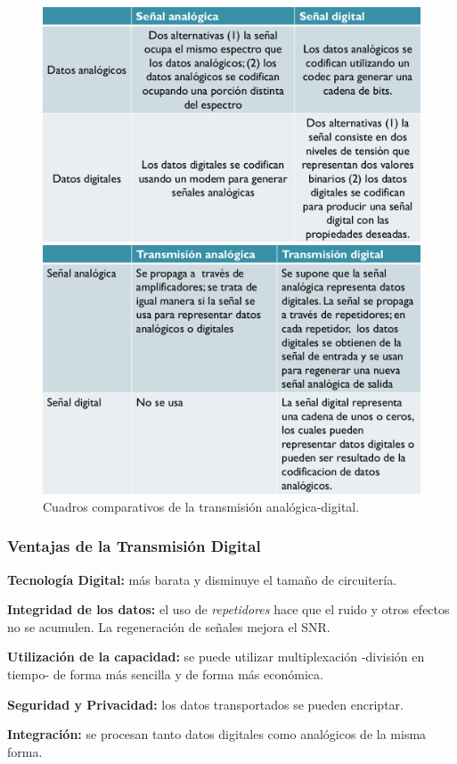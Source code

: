 \documentclass[10pt,a4paper]{article}
\begin{document}
\begin{figure}[ht!]
  \caption{Cuadros comparativos de la transmisión analógica-digital.}
  \label{fig:dig_ana}  
  \centerline{
	\includegraphics[width=0.75\textwidth-\fboxrule-\fboxrule]{imgs/dig_ana1.png}}
	\vspace{5pt}
  \centerline{
	\includegraphics[width=0.75\textwidth-\fboxrule-\fboxrule]{imgs/dig_ana2.png}  
  }  
\end{figure}

\subsubsection{Ventajas de la Transmisión Digital}
\begin{description}
\item \textbf{Tecnología Digital:} más barata y disminuye el tamaño de circuitería.
\item \textbf{Integridad de los datos:} el uso de \textit{repetidores} hace que el ruido y otros efectos no se acumulen. La regeneración de señales mejora el SNR.
\item \textbf{Utilización de la capacidad:} se puede utilizar multiplexación -división en tiempo- de forma más sencilla y de forma más económica.
\item \textbf{Seguridad y Privacidad:} los datos transportados se pueden encriptar.
\item \textbf{Integración:} se procesan tanto datos digitales como analógicos de la misma forma.
\end{description}
\end{document}
